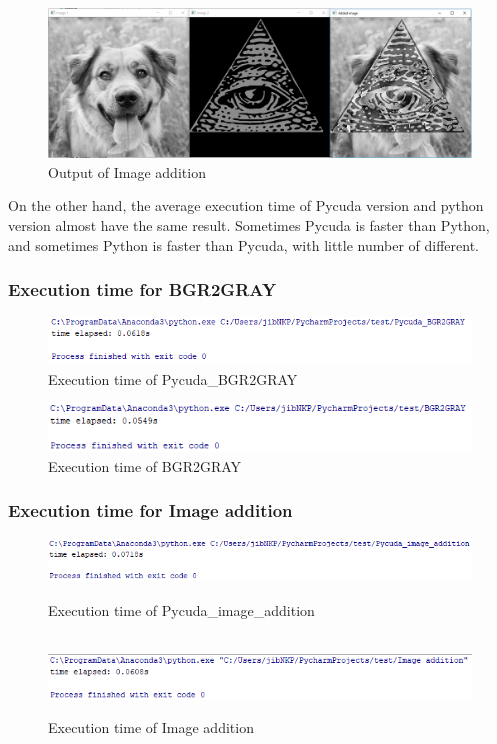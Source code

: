 \documentclass[11pt]{article}
\begin{document}
\begin{figure}[h]
\centering
\includegraphics[scale=0.42]{out4}
\caption{Output of Image addition}
\end{figure}


\newpage
On the other hand, the average execution time of Pycuda version and python version almost have the same result. Sometimes Pycuda is faster than Python, and sometimes Python is faster than Pycuda, with little number of different.

\subsubsection*{Execution time for BGR2GRAY}
\begin{figure}[h]
\centering
\includegraphics[scale=0.9]{out5}
\caption{Execution time of Pycuda\_BGR2GRAY}
\end{figure}

\begin{figure}[h]
\centering
\includegraphics[scale=0.9]{out6}
\caption{Execution time of BGR2GRAY}
\end{figure}

\subsubsection*{Execution time for Image addition}
\begin{figure}[h]
\centering
\includegraphics[scale=0.9]{out7}
\caption{Execution time of Pycuda\_image\_addition}
\textsc{}\\[0.5cm]
\includegraphics[scale=0.9]{out8}
\caption{Execution time of Image addition}
\end{figure}
\end{document}
